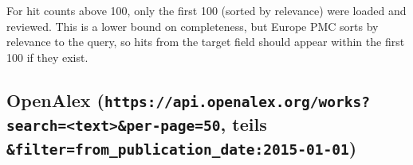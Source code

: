 For hit counts above 100, only the first 100 (sorted by relevance) were loaded and reviewed. This is a lower bound on completeness, but Europe PMC sorts by relevance to the query, so hits from the target field should appear within the first 100 if they exist.

\subsection{\texorpdfstring{OpenAlex (\texttt{https://api.openalex.org/works?search=\textless{}text\textgreater{}\&per-page=50}, teils \texttt{\&filter=from\_publication\_date:2015-01-01})}{OpenAlex (https://api.openalex.org/works?search=\textless text\textgreater\&per-page=50, teils \&filter=from\_publication\_date:2015-01-01)}}\label{openalex-httpsapi.openalex.orgworkssearchtextper-page50-teils-filterfrom_publication_date2015-01-01}

